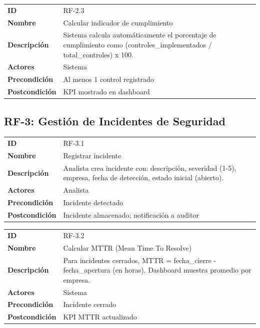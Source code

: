\documentclass[12pt,a4paper,oneside]{article}
\begin{document}
\begin{tabularx}{\linewidth}{|l|X|}
\hline
\textbf{ID} & RF-2.3 \\
\textbf{Nombre} & Calcular indicador de cumplimiento \\
\textbf{Descripción} & Sistema calcula automáticamente el porcentaje de cumplimiento como (controles\_implementados / total\_controles) x 100. \\
\textbf{Actores} & Sistema \\
\textbf{Precondición} & Al menos 1 control registrado \\
\textbf{Postcondición} & KPI mostrado en dashboard \\
\hline
\end{tabularx}

\subsection{RF-3: Gestión de Incidentes de Seguridad}

\begin{tabularx}{\linewidth}{|l|X|}
\hline
\textbf{ID} & RF-3.1 \\
\textbf{Nombre} & Registrar incidente \\
\textbf{Descripción} & Analista crea incidente con: descripción, severidad (1-5), empresa, fecha de detección, estado inicial (abierto). \\
\textbf{Actores} & Analista \\
\textbf{Precondición} & Incidente detectado \\
\textbf{Postcondición} & Incidente almacenado; notificación a auditor \\
\hline
\end{tabularx}

\begin{tabularx}{\linewidth}{|l|X|}
\hline
\textbf{ID} & RF-3.2 \\
\textbf{Nombre} & Calcular MTTR (Mean Time To Resolve) \\
\textbf{Descripción} & Para incidentes cerrados, MTTR = fecha\_cierre - fecha\_apertura (en horas). Dashboard muestra promedio por empresa. \\
\textbf{Actores} & Sistema \\
\textbf{Precondición} & Incidente cerrado \\
\textbf{Postcondición} & KPI MTTR actualizado \\
\hline
\end{tabularx}
\end{document}
